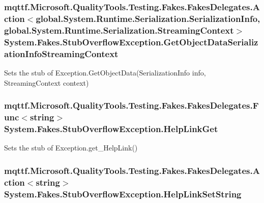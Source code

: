 \hypertarget{class_system_1_1_fakes_1_1_stub_overflow_exception_aa1b4dbbb967acf29622f6bb1235d15f3}{
\subsubsection[{Get\-Object\-Data\-Serialization\-Info\-Streaming\-Context}]{\setlength{\rightskip}{0pt plus 5cm}mqttf.\-Microsoft.\-Quality\-Tools.\-Testing.\-Fakes.\-Fakes\-Delegates.\-Action$<$global.\-System.\-Runtime.\-Serialization.\-Serialization\-Info, global.\-System.\-Runtime.\-Serialization.\-Streaming\-Context$>$ System.\-Fakes.\-Stub\-Overflow\-Exception.\-Get\-Object\-Data\-Serialization\-Info\-Streaming\-Context}}\label{class_system_1_1_fakes_1_1_stub_overflow_exception_aa1b4dbbb967acf29622f6bb1235d15f3}


Sets the stub of Exception.\-Get\-Object\-Data(\-Serialization\-Info info, Streaming\-Context context)

\hypertarget{class_system_1_1_fakes_1_1_stub_overflow_exception_a1cc569cb127f6f4096a14dce7d8cb6d0}{
\subsubsection[{Help\-Link\-Get}]{\setlength{\rightskip}{0pt plus 5cm}mqttf.\-Microsoft.\-Quality\-Tools.\-Testing.\-Fakes.\-Fakes\-Delegates.\-Func$<$string$>$ System.\-Fakes.\-Stub\-Overflow\-Exception.\-Help\-Link\-Get}}\label{class_system_1_1_fakes_1_1_stub_overflow_exception_a1cc569cb127f6f4096a14dce7d8cb6d0}


Sets the stub of Exception.\-get\-\_\-\-Help\-Link()

\hypertarget{class_system_1_1_fakes_1_1_stub_overflow_exception_a3a4cee50e5dff9211104319d5868fa2f}{
\subsubsection[{Help\-Link\-Set\-String}]{\setlength{\rightskip}{0pt plus 5cm}mqttf.\-Microsoft.\-Quality\-Tools.\-Testing.\-Fakes.\-Fakes\-Delegates.\-Action$<$string$>$ System.\-Fakes.\-Stub\-Overflow\-Exception.\-Help\-Link\-Set\-String}}\label{class_system_1_1_fakes_1_1_stub_overflow_exception_a3a4cee50e5dff9211104319d5868fa2f}


